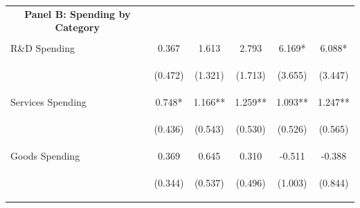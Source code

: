 \documentclass[dv_diss_main.tex]{subfiles}
\begin{document}
\begin{table}[H]
\begin{center}
{\begin{tabular}{lccccc}
    \multicolumn{1}{c}{\textbf{Panel B: Spending by Category}} \\ 
    \vspace{-1.5pt} & \vspace{-1.5pt} & \vspace{-1.5pt} & \vspace{-1.5pt} & \vspace{-1.5pt} \\
    R\&D Spending & 0.367 & 1.613 & 2.793 & 6.169* & 6.088* \\
    \vspace{4pt} & \begin{footnotesize}(0.472)\end{footnotesize} & \begin{footnotesize}(1.321)\end{footnotesize} & \begin{footnotesize}(1.713)\end{footnotesize} & \begin{footnotesize}(3.655)\end{footnotesize} & \begin{footnotesize}(3.447)\end{footnotesize} \\
    Services Spending & 0.748* & 1.166** & 1.259** & 1.093** & 1.247** \\
    \vspace{4pt} & \begin{footnotesize}(0.436)\end{footnotesize} & \begin{footnotesize}(0.543)\end{footnotesize} & \begin{footnotesize}(0.530)\end{footnotesize} & \begin{footnotesize}(0.526)\end{footnotesize} & \begin{footnotesize}(0.565)\end{footnotesize} \\
    Goods Spending & 0.369 & 0.645 & 0.310 & -0.511 & -0.388 \\
     & \begin{footnotesize}(0.344)\end{footnotesize} & \begin{footnotesize}(0.537)\end{footnotesize} & \begin{footnotesize}(0.496)\end{footnotesize} & \begin{footnotesize}(1.003)\end{footnotesize} & \begin{footnotesize}(0.844)\end{footnotesize} \\


\end{tabular}}
\end{center}
\end{table}
\end{document}
